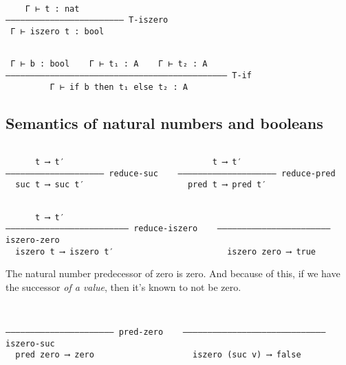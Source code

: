\documentclass[11pt]{article}
\theoremstyle{definition}
\begin{document}
\begin{verbatim}

    Γ ⊢ t : nat
–––––––––––––––––––––––– T-iszero
 Γ ⊢ iszero t : bool 

\end{verbatim}

\begin{verbatim}

 Γ ⊢ b : bool    Γ ⊢ t₁ : A    Γ ⊢ t₂ : A
––––––––––––––––––––––––––––––––––––––––––––– T-if
         Γ ⊢ if b then t₁ else t₂ : A

\end{verbatim}

\subsection{Semantics of natural numbers and booleans}
\label{sec:org9f7f993}

\begin{verbatim}

      t ⟶ t′                              t ⟶ t′                 
–––––––––––––––––––– reduce-suc    –––––––––––––––––––– reduce-pred                                 
  suc t ⟶ suc t′                     pred t ⟶ pred t′                                           

\end{verbatim}

\begin{verbatim}

      t ⟶ t′                                              
––––––––––––––––––––––––– reduce-iszero    ––––––––––––––––––––––– iszero-zero
  iszero t ⟶ iszero t′                       iszero zero ⟶ true                                           

\end{verbatim}

The natural number predecessor of zero is zero.
And because of this, if we have the successor \emph{of a value},
then it's known to not be zero.
\begin{verbatim}

                                              
–––––––––––––––––––––– pred-zero    ––––––––––––––––––––––––––––– iszero-suc
  pred zero ⟶ zero                    iszero (suc v) ⟶ false                                           

\end{verbatim}
\end{document}
